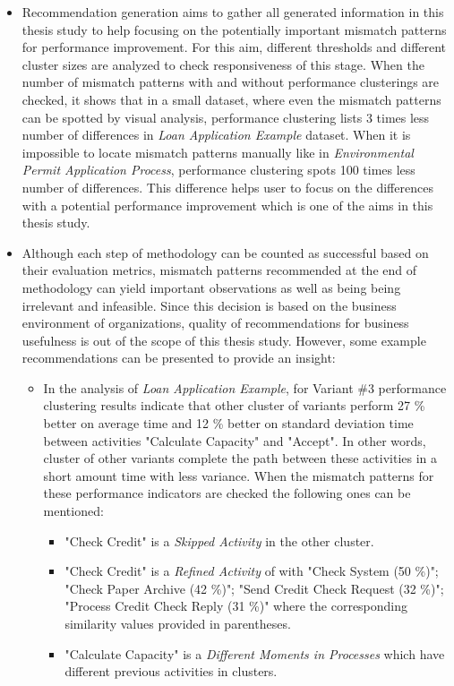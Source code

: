 \begin{itemize}
	\item Recommendation generation aims to gather all generated information in this thesis study to help focusing on the potentially important mismatch patterns for performance improvement. For this aim, different thresholds and different cluster sizes are analyzed to check responsiveness of this stage. When the number of mismatch patterns with and without performance clusterings are checked, it shows that in a small dataset, where even the mismatch patterns can be spotted by visual analysis, performance clustering lists 3 times less number of differences in \textit{Loan Application Example} dataset. When it is impossible to locate mismatch patterns manually like in \textit{Environmental Permit Application Process}, performance clustering spots 100 times less number of differences. This difference helps user to focus on the differences with a potential performance improvement which is one of the aims in this thesis study.
	\item Although each step of methodology can be counted as successful based on their evaluation metrics, mismatch patterns recommended at the end of methodology can yield important observations as well as being being irrelevant and infeasible. Since this decision is based on the business environment of organizations, quality of recommendations for business usefulness is out of the scope of this thesis study. However, some example recommendations can be presented to provide an insight:
	\begin{itemize}
	\item In the analysis of \textit{Loan Application Example}, for Variant \#3 performance clustering results indicate that other cluster of variants perform 27 \% better on average time and 12 \% better on standard deviation time between activities "Calculate Capacity" and "Accept". In other words, cluster of other variants complete the path between these activities in a short amount time with less variance. When the mismatch patterns for these performance indicators are checked the following ones can be mentioned:
		\begin{itemize}
		\item "Check Credit" is a \textit{Skipped Activity} in the other cluster.
		\item "Check Credit" is a \textit{Refined Activity} of with "Check System (50 \%)"; "Check Paper Archive (42 \%)"; "Send Credit Check Request (32 \%)"; "Process Credit Check Reply (31 \%)" where the corresponding similarity values provided in parentheses.
		\item "Calculate Capacity" is a \textit{Different Moments in Processes} which have different previous activities in clusters. 

\end{itemize}
\end{itemize}
\end{itemize}
